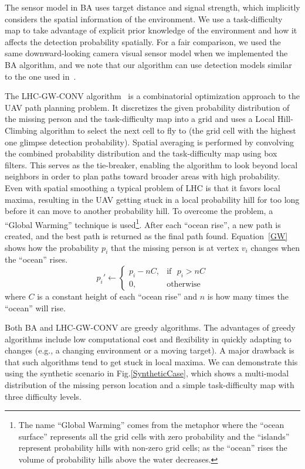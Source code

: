 The sensor model in BA uses target distance and signal strength, which implicitly considers the spatial information of the environment. We use a task-difficulty map to take advantage of explicit prior knowledge of the environment and how it affects the detection probability spatially. For a fair comparison, we used the same downward-looking camera visual sensor model when we implemented the BA algorithm, and we note that our algorithm can use detection models similar to the one used in~\cite{Bourgault2006Optimal}.

The LHC-GW-CONV algorithm~\cite{Lin2009UAV} is a combinatorial optimization approach to the UAV path planning problem. It discretizes the given probability distribution of the missing person and the task-difficulty map into a grid and uses a Local Hill-Climbing algorithm to select the next cell to fly to (the grid cell with the highest one glimpse detection probability). Spatial averaging is performed by convolving the combined probability distribution and the task-difficulty map using box filters. This serves as the tie-breaker, enabling the algorithm to look beyond local neighbors in order to plan paths toward broader areas with high probability. Even with spatial smoothing a typical problem of LHC is that it favors local maxima, resulting in the UAV getting stuck in a local probability hill for too long before it can move to another probability hill. To overcome the problem, a ``Global Warming'' technique is used\footnote{The name ``Global Warming'' comes from the metaphor where the ``ocean surface'' represents all the grid cells with zero probability and the ``islands'' represent probability hills with non-zero grid cells; as the ``ocean'' rises the volume of probability hills above the water decreases.}. After each ``ocean rise'', a new path is created, and the best path is returned as the final path found. Equation~\ref{GW} shows how the probability $p_i$ that the missing person is at vertex $v_i$  changes when the ``ocean'' rises.
\begin{equation}
p_i' \leftarrow
	\left\{
	\begin{array}{ll}
		p_i - nC, & \mbox{if~~} p_i > nC \\
		0, & \mbox{otherwise}
	\end{array}
	\right.
\label{GW}
\end{equation}
where $C$ is a constant height of each ``ocean rise'' and $n$ is how many times the ``ocean'' will rise.

Both BA and LHC-GW-CONV are greedy algorithms. The advantages of greedy algorithms include low computational cost and flexibility in quickly adapting to changes (e.g., a changing environment or a moving target). A major drawback is that such algorithms tend to get stuck in local maxima. We can demonstrate this using the synthetic scenario in Fig.\ref{SyntheticCase}, which shows a multi-modal distribution of the missing person location and a simple task-difficulty map with three difficulty levels. 

